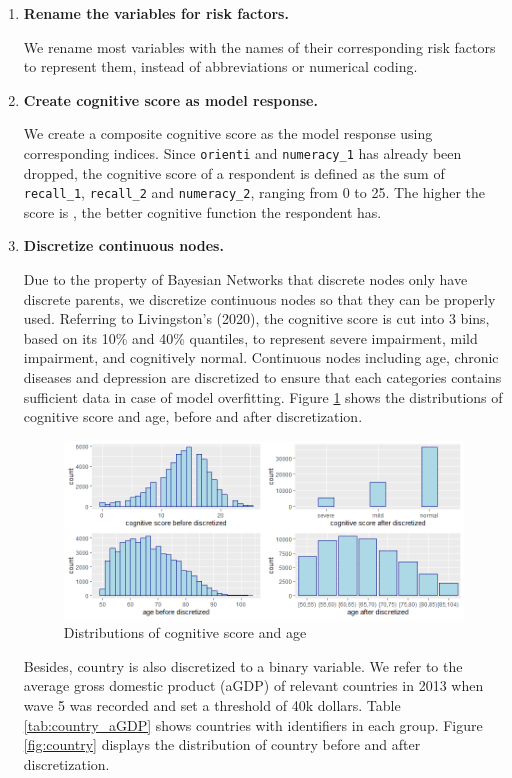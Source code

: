\documentclass[11pt,twoside]{article}
\numberwithin{Theorem}{section}
\numberwithin{Definition}{section}
\numberwithin{Lemma}{section}
\numberwithin{Algorithm}{section}
\numberwithin{equation}{section}
\begin{document}
\begin{enumerate}
	\item \textbf{Rename the variables for risk factors.}
		
	We rename most variables with the names of their corresponding risk factors to represent them, instead of abbreviations or numerical coding.
	
	\item \textbf{Create cognitive score as model response.}
	
	We create a composite cognitive score as the model response using corresponding indices. Since \texttt{orienti} and \texttt{numeracy\_1} has already been dropped, the cognitive score of a respondent is defined as the sum of \texttt{recall\_1}, \texttt{recall\_2} and \texttt{numeracy\_2}, ranging from 0 to 25. The higher the score is , the better cognitive function the respondent has. 
	
	\item \textbf{Discretize continuous nodes.}
	
	Due to the property of Bayesian Networks that discrete nodes only have discrete parents, we discretize continuous nodes so that they can be properly used. Referring to Livingston's (2020), the cognitive score is cut into 3 bins, based on its 10\% and 40\% quantiles, to represent severe impairment, mild impairment, and cognitively normal. Continuous nodes including age, chronic diseases and depression are discretized to ensure that each categories contains sufficient data in case of model overfitting. Figure \ref{fig:cog_age} shows the distributions of cognitive score and age, before and after discretization.
	
	\begin{figure}[!h]
		\centering
		\includegraphics[width = 0.75 \textwidth]{Images/cog_age.png}
		\caption{Distributions of cognitive score and age}
		\label{fig:cog_age}
	\end{figure}
		
	Besides, country is also discretized to a binary variable. We refer to the average gross domestic product (aGDP) of relevant countries in 2013 when wave 5 was recorded and set a threshold of 40k dollars. Table \ref{tab:country_aGDP} shows countries with identifiers in each group. Figure \ref{fig:country} displays the distribution of country before and after discretization.
	

\end{enumerate}
\end{document}
